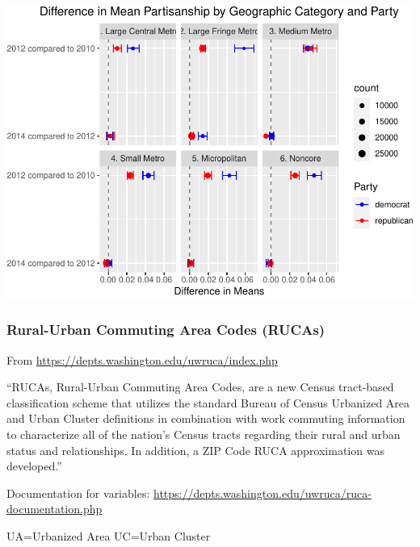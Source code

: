 \documentclass[10pt,]{article}
\begin{document}
\includegraphics{scratch_files/figure-latex/unnamed-chunk-39-1.pdf}
\newpage

\hypertarget{rural-urban-commuting-area-codes-rucas}{%
\subsubsection{Rural-Urban Commuting Area Codes
(RUCAs)}\label{rural-urban-commuting-area-codes-rucas}}

From \url{https://depts.washington.edu/uwruca/index.php}

``RUCAs, Rural-Urban Commuting Area Codes, are a new Census tract-based
classification scheme that utilizes the standard Bureau of Census
Urbanized Area and Urban Cluster definitions in combination with work
commuting information to characterize all of the nation's Census tracts
regarding their rural and urban status and relationships. In addition, a
ZIP Code RUCA approximation was developed.''

Documentation for variables:
\url{https://depts.washington.edu/uwruca/ruca-documentation.php}

UA=Urbanized Area UC=Urban Cluster
\end{document}
